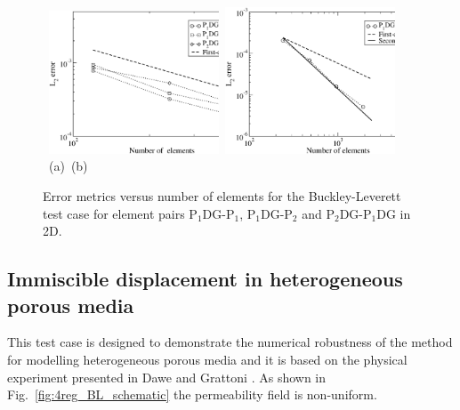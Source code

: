 \documentclass[times]{fldauth}
\newcommand{\PN}[2][error]{P$_{#1}$DG-P$_{#2}$}
\begin{document}
\begin{figure}[h!]
  \begin{center}
    \vbox{\hbox{
        \hspace{0.0cm}\includegraphics[width=0.45\textwidth]{Conv1.eps} 
        \hspace{0.0cm}\includegraphics[width=0.45\textwidth]{Conv2.eps}}
      \hbox{
        \vspace{-0.cm}\hbox{\hspace{3.0cm}(a)} 
        \vspace{-0.cm}\hbox{\hspace{6.0cm}(b)}}}
    \caption{Error metrics versus number of elements for the
      Buckley-Leverett test case for element pairs \PN[1]{1},
      \PN[1]{2} and \PN[2]{1}DG in 2D. \label{fig:errors_BL_2D}}
  \end{center}
\end{figure}



\subsection{Immiscible displacement in heterogeneous porous media}\label{res2}

This test case is designed to demonstrate the numerical robustness of
the method for modelling heterogeneous porous media and it is based on
the physical experiment presented in Dawe and Grattoni \cite{dawe_2008}. As shown in
Fig.~\ref{fig:4reg_BL_schematic} the permeability field is
non-uniform.
\end{document}

